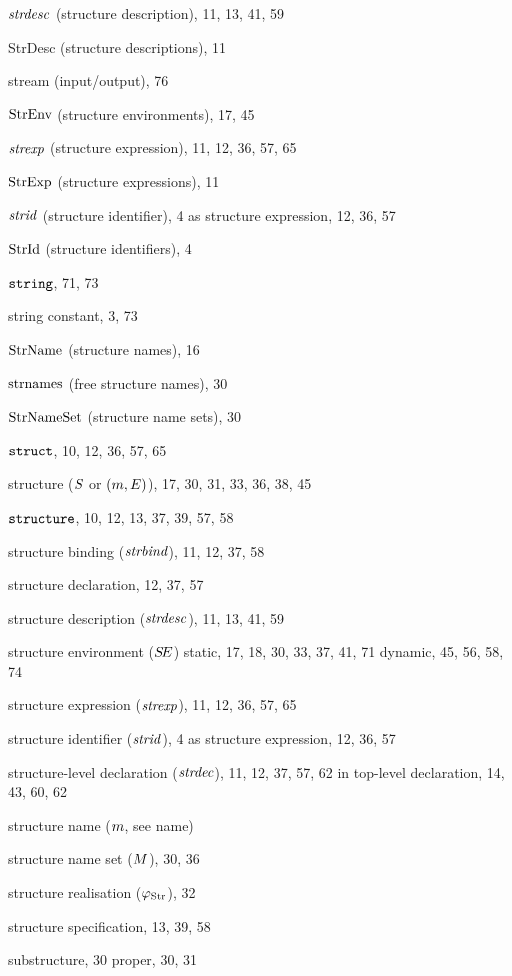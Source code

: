 \begin{theindex}
\item $\strdesc$ (structure description), 11, 13, 41, 59
\item StrDesc (structure descriptions), 11
\item stream (input/output), 76
\item $\StrEnv$ (structure environments), 17, 45
\item $\strexp$ (structure expression), 11, 12, 36, 57, 65
\item $\StrExp$ (structure expressions), 11
\item $\strid$ (structure identifier), 4
\subitem as structure expression, 12, 36, 57
\item $\StrId$ (structure identifiers), 4
\item $\STRING$, 71, 73
\item string constant, 3, 73
\item $\StrNames$ (structure names), 16
\item $\StrNamesFcn$ (free structure names), 30
\item $\StrNameSets$ (structure name sets), 30
\item $\STRUCT$, 10, 12, 36, 57, 65
\item structure ($\S$ or $(\m,\E)$), 17, 30, 31, 33, 36, 38, 45
\item $\STRUCTURE$, 10, 12, 13, 37, 39, 57, 58
\item structure binding ($\strbind$), 11, 12, 37, 58
\item structure declaration, 12, 37, 57
\item structure description ($\strdesc$), 11, 13, 41, 59
\item structure environment ($\SE$) 
\subitem static, 17, 18, 30, 33, 37, 41, 71
\subitem dynamic, 45, 56, 58, 74
\item structure expression ($\strexp$), 11, 12, 36, 57, 65
\item structure identifier ($\strid$), 4
\subitem as structure expression, 12, 36, 57
\item structure-level declaration ($\strdec$), 11, 12, 37, 57, 62
\subitem in top-level declaration, 14, 43, 60, 62
\item structure name ($\m$, see name) 
\item structure name set ($\M$), 30, 36
\item structure realisation ($\strrea$), 32
\item structure specification, 13, 39, 58
\item substructure, 30
\subitem proper, 30, 31

\end{theindex}
